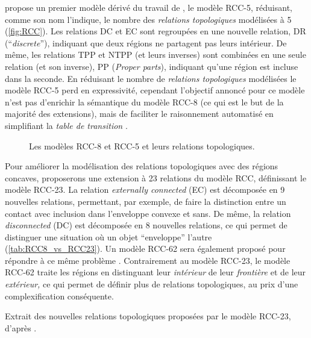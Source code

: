 \textcite{Bennett1994} propose un premier modèle dérivé du travail de
\textcite{Randell1992}, le modèle RCC-5, réduisant, comme son nom
l'indique, le nombre des \emph{relations topologiques} modélisées à 5
(\autoref{fig:RCC}). Les relations DC et EC sont regroupées en une
nouvelle relation, DR (\enquote{\emph{discrete}}), indiquant que deux
régions ne partagent pas leurs intérieur. De même, les relations TPP
et NTPP (et leurs inverses) sont combinées en une seule relation (et
son inverse), PP (\emph{Proper parts}), indiquant qu'une région est
incluse dans la seconde. En réduisant le nombre de \emph{relations
  topologiques} modélisées le modèle RCC-5 perd en expressivité,
cependant l'objectif annoncé pour ce modèle n'est pas d’enrichir la
sémantique du modèle RCC-8 (ce qui est le but de la majorité des
extensions), mais de faciliter le raisonnement automatisé en
simplifiant la \emph{table de transition} \autocite{Bennett1994}.

\begin{figure}[hb]
  \centering
  
  \caption[Les modèles RCC-8 et RCC-5 et leurs relations
  topologiques]{Les modèles RCC-8 et RCC-5 et leurs relations
    topologiques.}
  \label{fig:RCC}
\end{figure}

Pour améliorer la modélisation des relations topologiques avec des
régions concaves, \textcite{Cohn1997} proposerons une extension à 23
relations du modèle RCC, définissant le modèle RCC-23. La relation
\emph{externally connected} (EC) est décomposée en 9 nouvelles
relations, permettant, par exemple, de faire la distinction entre un
contact avec inclusion dans l'enveloppe convexe et sans. De même, la
relation \emph{disconnected} (DC) est décomposée en 8 nouvelles
relations, ce qui permet de distinguer une situation où un objet
\enquote{enveloppe} l'autre (\autoref{tab:RCC8_vs_RCC23}). Un modèle
RCC-62 sera également proposé pour répondre à ce même problème
\autocite{Yang2007}. Contrairement au modèle RCC-23, le modèle RCC-62
traite les régions en distinguant leur \emph{intérieur} de leur
\emph{frontière} et de leur \emph{extérieur,} ce qui permet de définir
plus de relations topologiques, au prix d'une complexification
conséquente.

\begin{table}
  \centering
  
  \caption{Extrait des nouvelles relations topologiques proposées par
    le modèle RCC-23, d'après \textcite{Cohn1997}.}
  \label{tab:RCC8_vs_RCC23}
\end{table}

